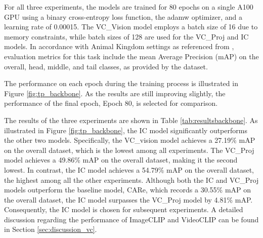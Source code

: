 For all three experiments, the models are trained for 80 epochs on a single A100 GPU using a binary cross-entropy loss function, the adamw optimizer, and a learning rate of 0.00015. The VC\_Vision model employs a batch size of 16 due to memory constraints, while batch sizes of 128 are used for the VC\_Proj and IC models. In accordance with Animal Kingdom settings as referenced from \parencite{ng2022animal}, evaluation metrics for this task include the mean Average Precision (mAP) on the overall, head, middle, and tail classes, as provided by the dataset. 


The performance on each epoch during the training process is illustrated in Figure \ref{fig:tp_backbone}. As the results are still improving slightly, the performance of the final epoch, Epoch 80, is selected for comparison. 

The results of the three experiments are shown in Table \ref{tab:resultsbackbone}. As illustrated in Figure \ref{fig:tp_backbone}, the IC model significantly outperforms the other two models. Specifically, the VC\_vision model achieves a 27.19\% mAP on the overall dataset, which is the lowest among all experiments. The VC\_Proj model achieves a 49.86\% mAP on the overall dataset, making it the second lowest. In contrast, the IC model achieves a 54.79\% mAP on the overall dataset, the highest among all the other experiments. Although both the IC and VC\_Proj models outperform the baseline model, CARe, which records a 30.55\% mAP on the overall dataset, the IC model surpasses the VC\_Proj model by 4.81\% mAP. Consequently, the IC model is chosen for subsequent experiments. A detailed discussion regarding the performance of ImageCLIP and VideoCLIP can be found in Section \ref{sec:discussion_vc}.

